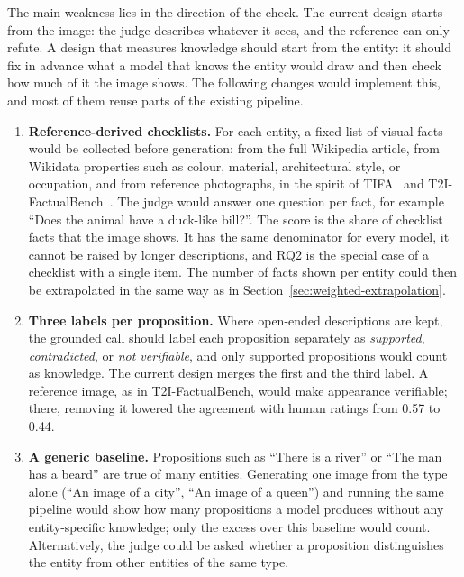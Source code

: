 The main weakness lies in the direction of the check. The current design starts
from the image: the judge describes whatever it sees, and the reference can
only refute. A design that measures knowledge should start from the entity: it
should fix in advance what a model that knows the entity would draw and then
check how much of it the image shows. The following changes would implement
this, and most of them reuse parts of the existing pipeline.

\begin{enumerate}
\item \textbf{Reference-derived checklists.} For each entity, a fixed list of
visual facts would be collected before generation: from the full Wikipedia
article, from Wikidata properties such as colour, material, architectural
style, or occupation, and from reference photographs, in the spirit of
TIFA~\citep{tifa2023} and T2I-FactualBench~\citep{t2ifactualbench2025}. The
judge would answer one question per fact, for example ``Does the animal have a
duck-like bill?''. The score is the share of checklist facts that the image
shows. It has the same denominator for every model, it cannot be raised by
longer descriptions, and RQ2 is the special case of a checklist with a single
item. The number of facts shown per entity could then be extrapolated in the
same way as in Section~\ref{sec:weighted-extrapolation}.

\item \textbf{Three labels per proposition.} Where open-ended descriptions are
kept, the grounded call should label each proposition separately as
\emph{supported}, \emph{contradicted}, or \emph{not verifiable}, and only
supported propositions would count as knowledge. The current design merges the
first and the third label. A reference image, as in T2I-FactualBench, would make
appearance verifiable; there, removing it lowered the agreement with human
ratings from 0.57 to 0.44.

\item \textbf{A generic baseline.} Propositions such as ``There is a river'' or
``The man has a beard'' are true of many entities. Generating one image from the
type alone (``An image of a city'', ``An image of a queen'') and running the same
pipeline would show how many propositions a model produces without any
entity-specific knowledge; only the excess over this baseline would count.
Alternatively, the judge could be asked whether a proposition distinguishes the
entity from other entities of the same type.


\end{enumerate}
